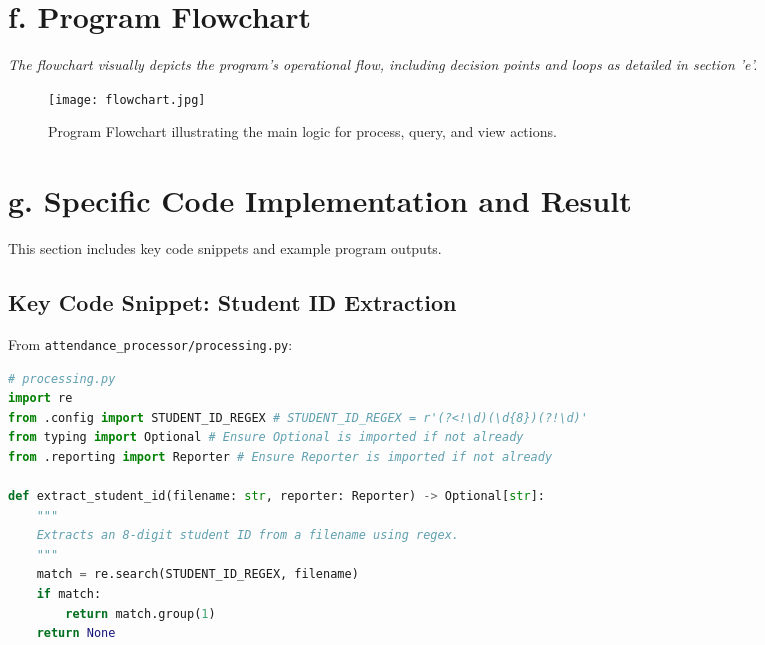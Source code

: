 \documentclass[11pt, a4paper]{article}
\begin{document}
\section*{f. Program Flowchart}
    \textit{The flowchart visually depicts the program's operational flow, including decision points and loops as detailed in section 'e'.}
\begin{figure}[htbp]
    \centering
    \begin{adjustbox}{max width=0.95\textwidth, max height=0.7\textheight, keepaspectratio} 
        \texttt{[image: flowchart.jpg]} 
    \end{adjustbox}
    \caption{Program Flowchart illustrating the main logic for process, query, and view actions.}
    \label{fig:flowchart}
\end{figure}


\newpage
\section*{g. Specific Code Implementation and Result}
This section includes key code snippets and example program outputs.

\subsection*{Key Code Snippet: Student ID Extraction}
From \texttt{attendance\_processor/processing.py}:
\begin{lstlisting}[language=Python, caption=Student ID Extraction Logic, basicstyle=\ttfamily\scriptsize]
# processing.py
import re
from .config import STUDENT_ID_REGEX # STUDENT_ID_REGEX = r'(?<!\d)(\d{8})(?!\d)'
from typing import Optional # Ensure Optional is imported if not already
from .reporting import Reporter # Ensure Reporter is imported if not already

def extract_student_id(filename: str, reporter: Reporter) -> Optional[str]:
    """
    Extracts an 8-digit student ID from a filename using regex.
    """
    match = re.search(STUDENT_ID_REGEX, filename)
    if match:
        return match.group(1)
    return None
\end{lstlisting}
\end{document}
